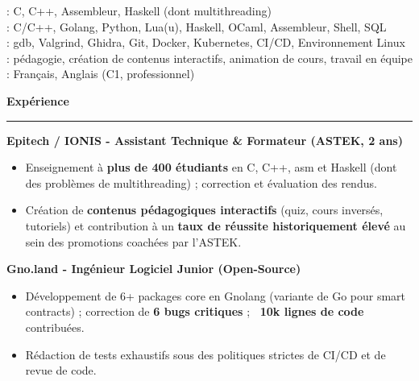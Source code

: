 \documentclass[9pt]{extarticle}
\begin{document}
\hspace*{5pt}{\bfseries Enseignés (ASTEK)}: C, C++, Assembleur, Haskell (dont multithreading)
\\
\hspace*{5pt}{\bfseries Maîtrise}: C/C++, Golang, Python, Lua(u), Haskell, OCaml, Assembleur, Shell, SQL
\\
\hspace*{5pt}{\bfseries Outils}: gdb, Valgrind, Ghidra, Git, Docker, Kubernetes, CI/CD, Environnement Linux
\\
\hspace*{5pt}{\bfseries Transverses}: pédagogie, création de contenus interactifs, animation de cours, travail en équipe
\\
\hspace*{5pt}{\bfseries Langues}: Français, Anglais (C1, professionnel)

\par\vspace{5pt}


{\large\bfseries Expérience}
\par\vspace{-8pt}
\rule{\linewidth}{0.4pt}
\par\vspace{5pt}

{\bfseries Epitech / IONIS - Assistant Technique \& Formateur (ASTEK, 2 ans)}
\begin{itemize}[noitemsep, topsep=0pt]
	\item Enseignement à {\bfseries plus de 400 étudiants} en C, C++, asm et Haskell (dont des problèmes de multithreading) ; correction et évaluation des rendus.
	\item Création de {\bfseries contenus pédagogiques interactifs} (quiz, cours inversés, tutoriels) et contribution à un {\bfseries taux de réussite historiquement élevé} au sein des promotions coachées par l'ASTEK.
\end{itemize}

\par\vspace{5pt}

{\bfseries Gno.land - Ingénieur Logiciel Junior (Open-Source)}
\begin{itemize}[noitemsep, topsep=0pt]
	\item Développement de 6+ packages core en Gnolang (variante de Go pour smart contracts) ; correction de {\bfseries 6 bugs critiques} ; {\bfseries ~10k lignes de code} contribuées.
	\item Rédaction de tests exhaustifs sous des politiques strictes de CI/CD et de revue de code.
\end{itemize}
\end{document}
